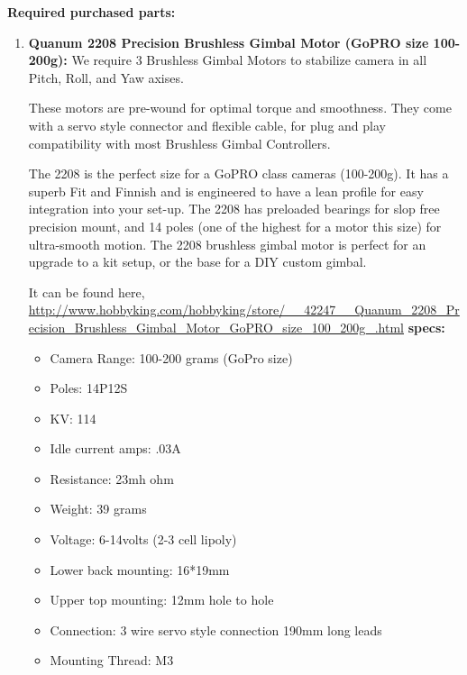 \documentclass[11pt,a4paper]{article}
\begin{document}
		\textbf{Required purchased parts:}
		\newline
		\begin{enumerate}
			\item \textbf{Quanum 2208 Precision Brushless Gimbal Motor (GoPRO size 100-200g):} We require 3 Brushless Gimbal Motors to stabilize camera in all Pitch, Roll, and Yaw axises. 
			\par These motors are pre-wound for optimal torque and smoothness. They come with a servo style connector and flexible cable, for plug and play compatibility with most Brushless Gimbal Controllers.
			\par The 2208 is the perfect size for a GoPRO class cameras (100-200g).  It has a superb Fit and Finnish and is engineered to have a lean profile for easy integration into your set-up. The 2208 has preloaded bearings for slop free precision mount, and 14 poles (one of the highest for a motor this size) for ultra-smooth motion. The 2208 brushless gimbal motor is perfect for an upgrade to a kit setup, or the base for a DIY custom gimbal.
			\par It can be found here,
			\newline
			\url{http://www.hobbyking.com/hobbyking/store/__42247__Quanum_2208_Precision_Brushless_Gimbal_Motor_GoPRO_size_100_200g_.html}
			\newline
			\textbf{specs:}
			\begin{itemize}
				\item Camera Range: 100-200 grams (GoPro size)
				\item Poles: 14P12S
				\item KV: 114
				\item Idle current amps: .03A
				\item Resistance: 23mh ohm
				\item Weight: 39 grams
				\item Voltage: 6-14volts (2-3 cell lipoly)
				\item Lower back mounting: 16*19mm
				\item Upper top mounting: 12mm hole to hole
				\item Connection: 3 wire servo style connection 190mm long leads
				\item Mounting Thread: M3
			\end{itemize}
			\begin{center}

\end{center}
\end{enumerate}
\end{document}

